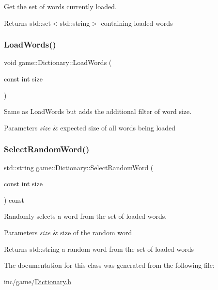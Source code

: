 Get the set of words currently loaded. 

\begin{DoxyReturn}{Returns}
std\+::set$<$std\+::string$>$ containing loaded words 
\end{DoxyReturn}
\mbox{\label{classgame_1_1Dictionary_af2b2b73b84ba946ad6cf81251bde39f9}} 
\subsubsection{\texorpdfstring{Load\+Words()}{LoadWords()}}
{\footnotesize\ttfamily void game\+::\+Dictionary\+::\+Load\+Words (\begin{DoxyParamCaption}\item[{const int}]{size }\end{DoxyParamCaption})}



Same as Load\+Words but adds the additional filter of word size. 


\begin{DoxyParams}{Parameters}
{\em size} & expected size of all words being loaded \\
\hline
\end{DoxyParams}
\mbox{\label{classgame_1_1Dictionary_aef5f57bd6ea644ba79c1982b8a5f5f33}} 
\subsubsection{\texorpdfstring{Select\+Random\+Word()}{SelectRandomWord()}}
{\footnotesize\ttfamily std\+::string game\+::\+Dictionary\+::\+Select\+Random\+Word (\begin{DoxyParamCaption}\item[{const int}]{size }\end{DoxyParamCaption}) const}



Randomly selects a word from the set of loaded words. 


\begin{DoxyParams}{Parameters}
{\em size} & size of the random word \\
\hline
\end{DoxyParams}
\begin{DoxyReturn}{Returns}
std\+::string a random word from the set of loaded words 
\end{DoxyReturn}


The documentation for this class was generated from the following file\+:\begin{DoxyCompactItemize}
\item 
inc/game/\hyperlink{Dictionary_8h}{Dictionary.\+h}\end{DoxyCompactItemize}

